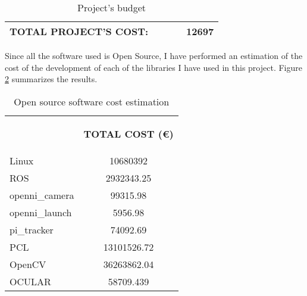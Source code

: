 \begin{appendices}
\begin{table}[H]
\begin{tabular} {l c c c c}
\midrule

\textbf{TOTAL PROJECT'S COST: }			&&&&			\textbf{12697}\\

\bottomrule
\end{tabular}
\caption[Project's budget]{Project's budget}
\label{budget}

\end{table}


		Since all the software used is Open Source, I have performed an estimation of the cost of the development of each of the libraries I have used in this project. 
		Figure \ref{estimations} summarizes the results.  






\begin{table}[H]
\centering
\begin{tabular} {l c}
\toprule
\addlinespace[3mm]
   \multicolumn{1}{c}{\begin{center}\textbf{SOFTWARE}\end{center}} &
   \multicolumn{1}{c}{\begin{center}\textbf{TOTAL COST (\euro)}\end{center}} &
\\
\addlinespace[-3mm]
\midrule
Linux	&	10680392	\\
ROS		&	2932343.25	\\
\hspace*{0.5cm}	openni\_camera	&	99315.98	\\
\hspace*{0.5cm}	openni\_launch	&	5956.98		\\
\hspace*{0.5cm}	pi\_tracker 	&	74092.69	\\
PCL	&	13101526.72		\\
OpenCV	&	36263862.04		\\
OCULAR	&	58709.439	\\

\bottomrule
\end{tabular}
\caption[Open source software cost estimation]{Open source software cost estimation}
\label{estimations}


\end{table}
\end{appendices}
